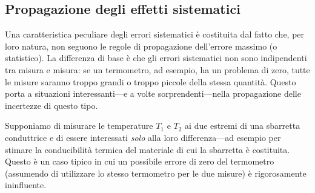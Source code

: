 \subsection{Propagazione degli effetti sistematici}

Una caratteristica peculiare degli errori sistematici è costituita dal
fatto che, per loro natura, non seguono le regole di propagazione
dell'errore massimo (o statistico). La differenza di base è che gli errori
sistematici non sono indipendenti tra misura e misura: se un termometro, ad
esempio, ha un problema di zero, tutte le misure saranno troppo grandi o troppo
piccole della stessa quantità. Questo porta a situazioni interessanti---e a
volte sorprendenti---nella propagazione delle incertezze di questo tipo.

\begin{examplebox}
  \begin{example}
    Supponiamo di misurare le temperature $T_1$ e $T_2$ ai due estremi di una
    sbarretta conduttrice e di essere interessati \emph{solo} alla loro
    differenza---ad esempio per stimare la conducibilità termica del materiale
    di cui la sbarretta è costituita. Questo è un caso tipico in cui
    un possibile errore di zero del termometro (assumendo di utilizzare
    lo stesso termometro per le due misure) è rigorosamente ininfluente.
  \end{example}
\end{examplebox}


\summary


